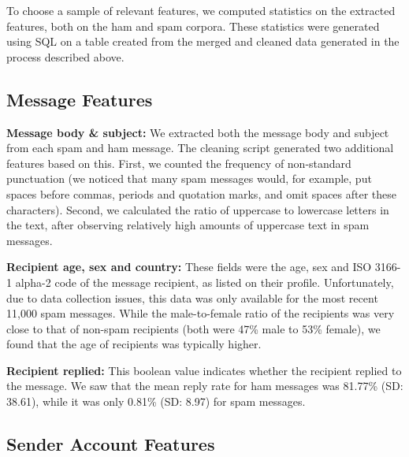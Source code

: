 \documentclass[preprint]{acm_proc_article-sp}
\begin{document}
To choose a sample of relevant features, we computed statistics on the extracted features, both on the ham and spam corpora. These statistics were generated using SQL on a table created from the merged and cleaned data generated in the process described above.

\subsection{Message Features}

\textbf{Message body \& subject:} We extracted both the message body and subject from 
each spam and ham message. The cleaning script generated two additional features based 
on this. First, we counted the frequency of non-standard punctuation (we noticed that many 
spam messages would, for example, put spaces before commas, periods and quotation marks, 
and omit spaces after these characters). Second, we calculated the ratio of uppercase to 
lowercase letters in the text, after observing relatively high amounts of uppercase text in spam messages.

\textbf{Recipient age, sex and country:} These fields were the age, sex and ISO 3166-1 alpha-2 code of the message 
recipient, as listed on their profile. Unfortunately, due to data collection issues, this data was only available 
for the most recent 11,000 spam messages. While the male-to-female ratio of the recipients was very close to that 
of non-spam recipients (both were 47\% male to 53\% female), we found that the age of recipients was typically higher.

\textbf{Recipient replied:} This boolean value indicates whether the recipient replied to the message. We saw 
that the mean reply rate for ham messages was 81.77\% (SD: 38.61), while it was only 0.81\% (SD: 8.97) for spam messages. 

\subsection{Sender Account Features}
\end{document}
